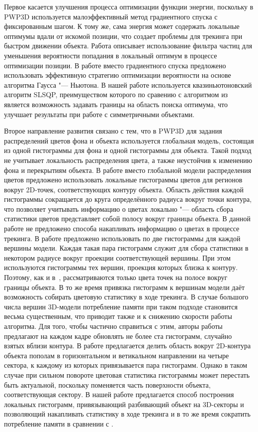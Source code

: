 Первое касается улучшения процесса оптимизации функции энергии, поскольку в
PWP3D используется малоэффективный метод градиентного спуска с фиксированным
шагом.
К тому же, сама энергия может содержать локальные оптимумы вдали от искомой
позиции, что создает проблемы для трекинга при быстром движении объекта.
Работа \cite{Zhao2014} описывает использование фильтра частиц для уменьшения
вероятности попадания в локальный оптимум в процессе оптимизации позиции.
В работе \cite{Tjaden2018} вместо градиентного спуска предложено использовать
эффективную стратегию оптимизации вероятности на основе алгоритма
Гаусса "--- Ньютона.
В нашей работе используется квазиньютоновский алгоритм SLSQP, преимуществом
которого по сравению с алгоритмом из \cite{Tjaden2018} является возможность
задавать границы на область поиска оптимума, что улучшает результаты при работе
с симметричными объектами.

Второе направление развития связано с тем, что в PWP3D для задания
распределений цветов фона и объекта используется глобальная модель, состоящая
из одной гистограммы для фона и одной гистограммы для объекта.
Такой подход не учитывает локальность распределения цвета, а также неустойчив к
изменению фона и перекрытиям объекта.
В работе \cite{Hexner2016} вместо глобальной модели распределения цветов
предложено использовать локальные гистограммы цветов для регионов вокруг
2D-точек, соответствующих контуру объекта.
Область действия каждой гистограммы сокращается до круга определённого радиуса
вокруг точки контура, что позволяет учитывать информацию о цветах локально "---
область сбора статистики цветов представляет собой полосу вокруг границы
объекта.
В данной работе не предложено способа накапливать информацию о цветах в
процессе трекинга.
В работе \cite{Tjaden2017} предложено использовать по две гистограммы для
каждой вершины модели.
Каждая такая пара гистограмм служит для сбора статистики в некотором радиусе
вокруг проекции соответствующей вершины.
При этом используются гистограммы тех вершин, проекция которых близка к
контуру.
Поэтому, как и в~\cite{Hexner2016}, рассматриваются только цвета точек на
полосе вокруг границы объекта.
В то же время привязка гистограмм к вершинам модели даёт возможность собирать
цветовую статистику в ходе трекинга.
В случае большого числа вершин 3D-модели потребление памяти при таком подходе
становится весьма существенным, что приводит также и к снижению скорости работы
алгоритма.
Для того, чтобы частично справиться с этим, авторы работы \cite{Tjaden2017}
предлагают на каждом кадре обновлять не более ста гистограмм, случайно взятых
вблизи контура.
В работе \cite{Zhong2018} предлагается делить  область вокруг 2D-контура
объекта пополам в горизонтальном и ветикальном направлении на четыре сектора,
к каждому из которых привязывается пара гистограмм.
Однако в таком случае при сильном повороте цветовая статистика гистограммы
может перестать быть актуальной, поскольку поменяется часть поверхности
объекта, соответствующая сектору.
В нашей работе предлагается способ построения локальных гистограмм,
привязывающий разбивающий объект на 3D-секторы и позволяющий накапливать
статистику в ходе трекинга и в то же время сократить потребление памяти в
сравнении с \cite{Tjaden2017}.

